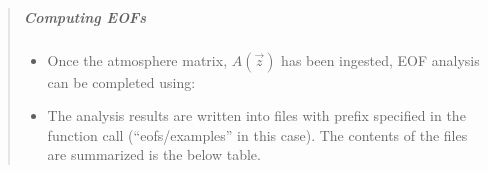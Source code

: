 \documentclass[letterpaper,10pt,english]{sphinxmanual}
\begin{document}
\begin{itemize}
\begin{quote}
\begin{itemize}
\begin{quote}
\begin{itemize}
\end{itemize}

\begin{sphinxVerbatim}[commandchars=\\\{\}]
    
\end{sphinxVerbatim}
\end{quote}

\end{itemize}


\subparagraph{Computing EOFs}
\label{\detokenize{eofs:computing-eofs}}\begin{itemize}
\item {} 
Once the atmosphere matrix, \(A(\vec{z})\) has been ingested, EOF analysis can be completed using:

\end{itemize}

\begin{sphinxVerbatim}[commandchars=\\\{\}]
  
\end{sphinxVerbatim}
\begin{itemize}
\item {} 
The analysis results are written into files with prefix specified in the function call (“eofs/examples” in this case).  The contents of the files are summarized is the below table.

\end{itemize}



\end{quote}
\end{itemize}
\end{document}
